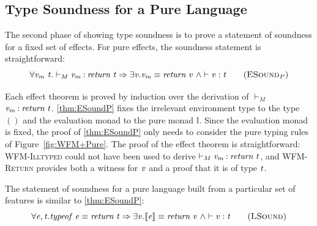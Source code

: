

\subsection{Type Soundness for a Pure Language}

The second phase of showing type soundness is to prove a statement of
soundness for a fixed set of effects. For pure effects, the
soundness statement is straightforward:
\begin{equation}
\forall \ensuremath{\Varid{v}_\Varid{m}}~\ensuremath{\Varid{t}}. \vdash_M \ensuremath{\Varid{v}_\Varid{m}\mathbin{:}\Varid{return}\;\Varid{t}} \Rightarrow \exists \ensuremath{\Varid{v}}. \ensuremath{\Varid{v}_\Varid{m}\equiv \Varid{return}\;\Varid{v}}~\wedge \vdash \ensuremath{\Varid{v}} : \ensuremath{\Varid{t}}
\tag{\textsc{ESound}$_P$}\label{thm:ESoundP}
\end{equation}

Each effect theorem is proved by induction over the derivation of
$\vdash_M$ \ensuremath{\Varid{v}_\Varid{m}\mathbin{:}\Varid{return}\;\Varid{t}}. \ref{thm:ESoundP} fixes the
irrelevant environment type to the type \ensuremath{()} and the evaluation monad
to the pure monad \ensuremath{\mathbb{I}}. Since the evaluation monad is fixed, the proof
of \ref{thm:ESoundP} only needs to consider the pure typing rules of
Figure~\ref{fig:WFM+Pure}. The proof of the effect theorem is
straightforward: \textsc{WFM-Illtyped} could not have been used to derive
$\vdash_M \mathit{v}_{\mathit{m}}\mathbin{:}\mathit{return}\;\mathit{t}$, and \textsc{WFM-Return} provides both a witness
for \ensuremath{\Varid{v}} and a proof that it is of type \ensuremath{\Varid{t}}.

The statement of soundness for a pure language built from a particular
set of features is similar to \ref{thm:ESoundP}:
\begin{equation}
\forall \ensuremath{\Varid{e}}, \ensuremath{\Varid{t}}. \ensuremath{\Varid{typeof}\;\Varid{e}\equiv \Varid{return}\;\Varid{t}} \Rightarrow \exists \ensuremath{\Varid{v}}. \ensuremath{\llbracket \Varid{e}\rrbracket\equiv \Varid{return}\;\Varid{v}}~\wedge \vdash \ensuremath{\Varid{v}} : \ensuremath{\Varid{t}}
\tag{\textsc{LSound}}\label{thm:LSoundP}
\end{equation}

